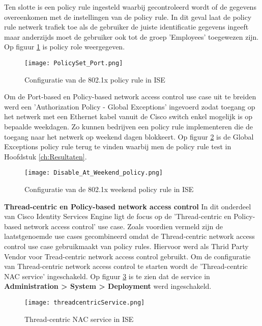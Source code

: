  	Ten slotte is een policy rule ingesteld waarbij gecontroleerd wordt of de gegevens overeenkomen met de instellingen van de policy rule. In dit geval laat de policy rule netwerk trafiek toe als de gebruiker de juiste identificatie gegevens ingeeft maar anderzijds moet de gebruiker ook tot de groep 'Employees' toegewezen zijn. Op figuur \ref{fig:ISESwitch} is policy role weergegeven.
 	
	 	 \begin{figure}[H]
		\centering
		\texttt{[image: PolicySet\_Port.png]}
		\caption{Configuratie van de 802.1x policy rule in ISE}%
		\label{fig:ISESwitch}%
		\end{figure}
	\newpage
	Om de Port-based en Policy-based network access control use case uit te breiden werd een 'Authorization Policy - Global Exceptions' ingevoerd zodat toegang op het netwerk met een Ethernet kabel vanuit de Cisco switch enkel mogelijk is op bepaalde weekdagen. Zo kunnen bedrijven een policy rule implementeren die de toegang naar het netwerk op weekend dagen blokkeert. Op figuur \ref{fig:weekend} is de Global Exceptions policy rule terug te vinden waarbij men de policy rule test in Hoofdstuk \ref{ch:Resultaten}. 
	
	\begin{figure}[H]
		\centering
		\texttt{[image: Disable\_At\_Weekend\_policy.png]}
		\caption{Configuratie van de 802.1x weekend policy rule in ISE}%
		\label{fig:weekend}%
	\end{figure}
\fontsize{12}{20}\textbf{Thread-centric en Policy-based network access control }
 \newline
 \newline
 In dit onderdeel van Cisco Identity Services Engine ligt de focus op de 'Thread-centric en Policy-based network access control' use case. Zoals voordien vermeld zijn de laatstgenoemde use cases gecombineerd omdat de Thread-centric network access control use case gebruikmaakt van policy rules. Hiervoor werd \cite{Rapid7_nexpose} als Thrid Party Vendor voor Tread-centric network access control gebruikt.
 \newline
 \newline
 Om de configuratie van Thread-centric network access control te starten wordt de 'Thread-centric NAC service' ingeschakeld. Op figuur \ref{fig:serviceThread} is te zien dat de service in \textbf{Administration > System > Deployment} werd ingeschakeld.
 
\begin{figure}[H]
		 	\centering
		 	\texttt{[image: threadcentricService.png]}
		 	\caption{Thread-centric NAC service in ISE}%
		 	\label{fig:serviceThread}%
\end{figure}

